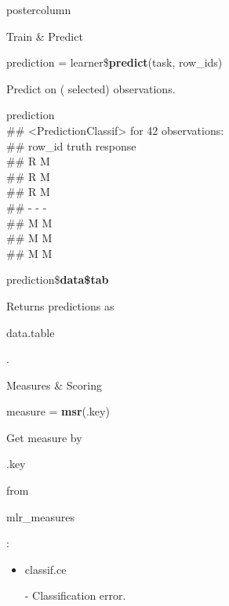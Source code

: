 \documentclass{beamer}
\newcommand{\codeinline}[1]{\begin{codeboxinline}#1\end{codeboxinline}}
\begin{document}
\begin{frame}[fragile]{}
\begin{columns}
\begin{column}{.245\textwidth}
\begin{beamercolorbox}[center]{postercolumn}
\begin{minipage}{.98\textwidth}
{\begin{myblock}{Train \& Predict}
							\\
							\vspace{1em} %
							\begin{codebox}
								prediction = learner\$\textbf{predict}(task, row\_ids)
							\end{codebox}
							Predict on ( selected) observations.
							\\
							\begin{codeboxmultiline}[width=23cm]
								{\footnotesize prediction\\
									\#\# <PredictionClassif> for 42 observations:\\
									\#\# row\_id truth response\\
									\#\# \space\space\space\space\space 2
									\space\space\space\space R \space\space\space\space\space\space\space M\\
									\#\# \space\space\space\space\space 3
									\space\space\space\space R \space\space\space\space\space\space\space M\\
									\#\# \space\space\space\space\space 5
									\space\space\space\space R \space\space\space\space\space\space\space M\\
									\#\# - - -\\
									\#\# \space\space\space 198
									\space\space\space\space M \space\space\space\space\space\space\space M\\
									\#\# \space\space{}00
									\space\space\space\space M \space\space\space\space\space\space\space M\\
									\#\# \space\space\space 207
									\space\space\space\space M \space\space\space\space\space\space\space M}
							\end{codeboxmultiline}
							\vspace{1em}
							\begin{codebox}
								prediction\$\textbf{data\$tab}
							\end{codebox}
							Returns predictions as \codeinline{data.table}.
						\end{myblock}
						\begin{myblock}{Measures \& Scoring}
							\begin{codebox}
								measure = \textbf{msr}(.key)
							\end{codebox}
							Get measure by \codeinline{.key} from \codeinline{mlr\_measures}:
							\begin{itemize}
								\item \codeinline{classif.ce} - Classification error.

\end{itemize}
\end{myblock}}
\end{minipage}
\end{beamercolorbox}
\end{column}
\end{columns}
\end{frame}
\end{document}
